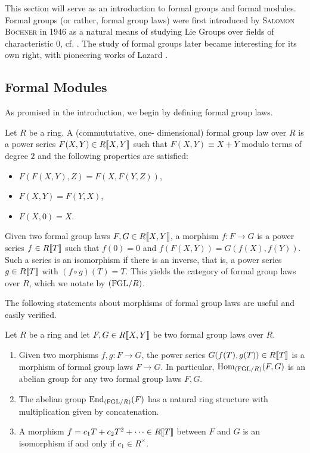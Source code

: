 This section will serve as an introduction to formal groups and 
formal modules. Formal groups (or rather, formal group laws) were first
introduced by \textsc{Salomon Bochner} in 1946 as a natural means of studying Lie
Groups over fields of characteristic $0$, cf. \cite{Bochner1946FGrps}. 
The study of formal groups later became interesting for its own right, 
with pioneering works of Lazard \cite{Lazard1955FGrps}.

\subsection{Formal Modules} %
\label{sub:Formal Modules}
As promised in the introduction, we begin by defining {formal group
laws}.

\begin{defi}
    Let $R$ be a ring. A (commututative, one-\allowbreak
    dimen\-sional) formal group law over $R$ is a power series $F(X,Y) \in
    R\llbracket X, Y \rrbracket$ such that $F(X,Y) \equiv X + Y$ modulo terms
    of degree $2$ and
    the following properties are satisfied:
    \begin{itemize}
        \item $F(F(X,Y),Z) = F(X,F(Y,Z))$,
        \item $F(X,Y) = F(Y,X)$,
        \item $F(X,0) = X$.
    \end{itemize}
\end{defi}

Given two formal group laws $F, G \in R\llbracket X,Y\rrbracket$, a morphism
$f: F\to G$ is a 
power series $f \in R\llbracket T \rrbracket$ such that $f(0) = 0$ and $f(F(X,Y)) =
G(f(X),f(Y))$.
Such a series is an isomorphism if there is an {inverse}, that
is, a power series $g \in R\llbracket T \rrbracket$ with $(f \circ g)(T) = T$.
This yields the category of formal group laws over $R$, which we notate by
${(\mathrm{FGL}/{R})}$.

The following statements about morphisms of formal group laws are 
useful and easily verified.
\begin{lem}\label{lem:FGLeasyfacts}
  Let $R$ be a ring and let $F,G \in R\llbracket X,Y\rrbracket$ be two formal
  group laws over $R$. 
  \begin{enumerate}
    \item Given two morphisms $f,g : F \to G$, the power series $G(f(T), g(T))
      \in R\llbracket T \rrbracket$ is a morphism of formal group laws 
      $F \to G$. In particular, $\operatorname{Hom}_{(\mathrm{FGL}/{R})}(F,G)$ is an abelian
      group for any two formal group laws $F,G$.
    \item The abelian group $\operatorname{End}_{(\mathrm{FGL}/{R})}(F)$ has a natural ring structure
      with multiplication given by concatenation.
    \item A morphism $f = c_1 T + c_2 T^2 + \dots \in R\llbracket T \rrbracket$ between
      $F$ and $G$ is an isomorphism if and only if $c_1 \in R^\times$.
  \end{enumerate}
\end{lem}

